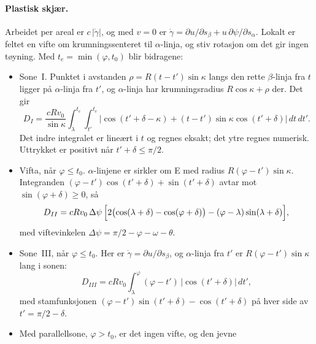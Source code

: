 \documentclass[11pt,a4paper]{article}
\begin{document}
\paragraph{Plastisk skjær.}  Arbeidet per areal er $c\,|\dot\gamma|$, og med
$v = 0$ er $\dot\gamma = \partial u/\partial s_\beta + u\,\partial\psi/\partial
s_\alpha$.  Lokalt er feltet en vifte om krumningssenteret til
$\alpha$-linja, og stiv rotasjon om det gir ingen tøyning.  Med
$t_e = \min(\varphi, t_0)$ blir bidragene:
\begin{itemize}
  \item Sone~I.  Punktet i avstanden $\rho = R(t - t')\sin\kappa$ langs den
        rette $\beta$-linja fra $t$ ligger på $\alpha$-linja fra $t'$, og
        $\alpha$-linja har krumningsradius $R\cos\kappa + \rho$ der.  Det
        gir
\begin{equation}
  D_I = \frac{c R v_0}{\sin\kappa}
        \int_\lambda^{t_e}\!\!\int_{t'}^{t_e}
        \bigl|\cos(t' + \delta - \kappa) + (t - t')\sin\kappa\cos(t' + \delta)\bigr|
        \,dt\,dt' .
  \label{eq:DI}
\end{equation}
        Det indre integralet er lineært i $t$ og regnes eksakt; det ytre
        regnes numerisk.  Uttrykket er positivt når $t' + \delta \le
        \pi/2$.
  \item Vifta, når $\varphi \le t_0$.  $\alpha$-linjene er sirkler om E med
        radius $R(\varphi - t')\sin\kappa$.  Integranden $(\varphi -
        t')\cos(t' + \delta) + \sin(t' + \delta)$ avtar mot $\sin(\varphi +
        \delta) \ge 0$, så
\begin{equation}
  D_{II} = c R v_0\,\Delta\psi\,\Bigl[2\bigl(\cos(\lambda + \delta)
           - \cos(\varphi + \delta)\bigr) - (\varphi - \lambda)\sin(\lambda + \delta)\Bigr] ,
\end{equation}
        med viftevinkelen $\Delta\psi = \pi/2 - \varphi - \omega - \theta$.
  \item Sone~III, når $\varphi \le t_0$.  Her er $\dot\gamma = \partial
        u/\partial s_\beta$, og $\alpha$-linja fra $t'$ er
        $R(\varphi - t')\sin\kappa$ lang i sonen:
\begin{equation}
  D_{III} = c R v_0 \int_\lambda^\varphi (\varphi - t')\,\bigl|\cos(t' + \delta)\bigr|\,dt' ,
\end{equation}
        med stamfunksjonen $(\varphi - t')\sin(t' + \delta) - \cos(t' + \delta)$
        på hver side av $t' = \pi/2 - \delta$.
  \item Med parallellsone, $\varphi > t_0$, er det ingen vifte, og den jevne

\end{itemize}
\end{document}
